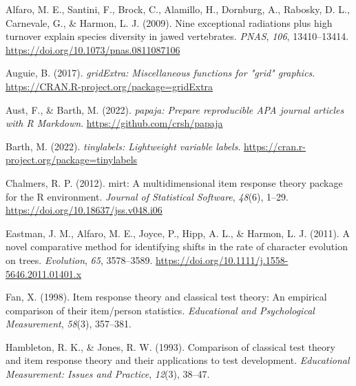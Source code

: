 \documentclass[
  man]{apa6}
\newlength{\cslhangindent}
\newlength{\cslentryspacingunit} %
\newenvironment{CSLReferences}[2] %
 {%
  \setlength{\parindent}{0pt}
  \ifodd #1
  \let\oldpar\par
  \def\par{\hangindent=\cslhangindent\oldpar}
  \fi
  \setlength{\parskip}{#2\cslentryspacingunit}
 }%
 {}
\begin{document}
\begingroup
\setlength{\parindent}{-0.5in}
\setlength{\leftskip}{0.5in}

\hypertarget{refs}{}
\begin{CSLReferences}{1}{0}
\leavevmode{}%
Alfaro, M. E., Santini, F., Brock, C., Alamillo, H., Dornburg, A., Rabosky, D. L., Carnevale, G., \& Harmon, L. J. (2009). Nine exceptional radiations plus high turnover explain species diversity in jawed vertebrates. \emph{PNAS}, \emph{106}, 13410--13414. \url{https://doi.org/10.1073/pnas.0811087106}

\leavevmode{}%
Auguie, B. (2017). \emph{gridExtra: Miscellaneous functions for "grid" graphics}. \url{https://CRAN.R-project.org/package=gridExtra}

\leavevmode{}%
Aust, F., \& Barth, M. (2022). \emph{{papaja}: {Prepare} reproducible {APA} journal articles with {R Markdown}}. \url{https://github.com/crsh/papaja}

\leavevmode{}%
Barth, M. (2022). \emph{{tinylabels}: Lightweight variable labels}. \url{https://cran.r-project.org/package=tinylabels}

\leavevmode{}%
Chalmers, R. P. (2012). {mirt}: A multidimensional item response theory package for the {R} environment. \emph{Journal of Statistical Software}, \emph{48}(6), 1--29. \url{https://doi.org/10.18637/jss.v048.i06}

\leavevmode{}%
Eastman, J. M., Alfaro, M. E., Joyce, P., Hipp, A. L., \& Harmon, L. J. (2011). A novel comparative method for identifying shifts in the rate of character evolution on trees. \emph{Evolution}, \emph{65}, 3578--3589. \url{https://doi.org/10.1111/j.1558-5646.2011.01401.x}

\leavevmode{}%
Fan, X. (1998). Item response theory and classical test theory: An empirical comparison of their item/person statistics. \emph{Educational and Psychological Measurement}, \emph{58}(3), 357--381.

\leavevmode{}%
Hambleton, R. K., \& Jones, R. W. (1993). Comparison of classical test theory and item response theory and their applications to test development. \emph{Educational Measurement: Issues and Practice}, \emph{12}(3), 38--47.


\end{CSLReferences}
\end{document}
